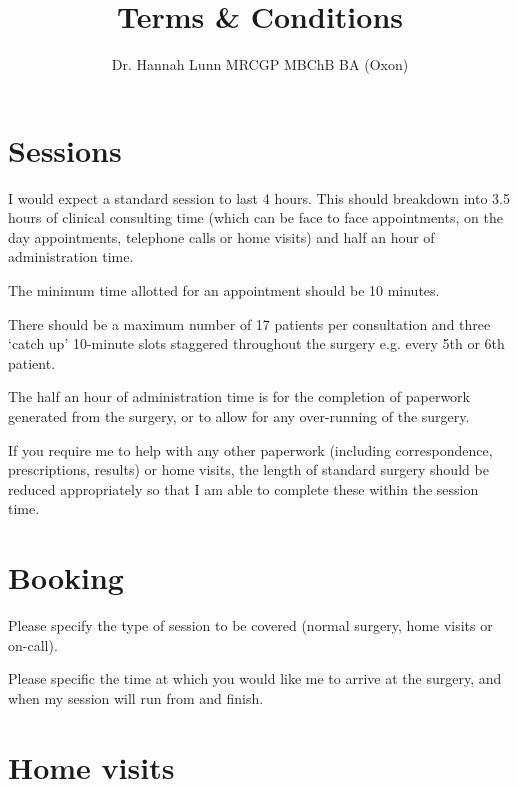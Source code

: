 \documentclass[12pt, a4paper]{article}
\title{Terms \& Conditions\vspace{-2ex}}}
\author{Dr. Hannah Lunn MRCGP MBChB BA (Oxon)\vspace{-2ex}}
\begin{document}
\maketitle

\section{Sessions}
\label{sessions}

I would expect a standard session to last 4 hours.
This should breakdown into 3.5 hours of clinical consulting time (which can be face to face appointments, on the day appointments, telephone calls or home visits) and half an hour of administration time.

The minimum time allotted for an appointment should be 10 minutes.

There should be a maximum number of 17 patients per consultation and three ‘catch up’ 10-minute slots staggered throughout the surgery e.g. every 5th or 6th patient.

The half an hour of administration time is for the completion of paperwork generated from the surgery, or to allow for any over-running of the surgery.

If you require me to help with any other paperwork (including correspondence, prescriptions, results) or home visits, the length of standard surgery should be reduced appropriately so that I am able to complete these within the session time.

\section{Booking}

Please specify the type of session to be covered (normal surgery, home visits or on-call).

Please specific the time at which you would like me to arrive at the surgery, and when my session will run from and finish.

\section{Home visits}
\end{document}
